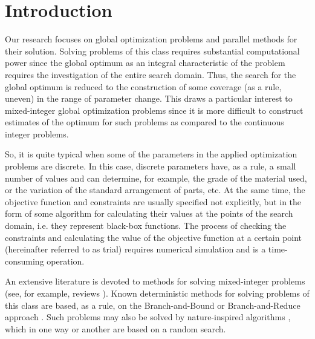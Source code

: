 \documentclass[
11pt,%
tightenlines,%
twoside,%
onecolumn,%
nofloats,%
nobibnotes,%
nofootinbib,%
superscriptaddress,%
noshowpacs,%
centertags]%
{revtex4}
\begin{document}

\maketitle


\section{Introduction}

Our research focuses on global optimization problems and parallel methods for their solution. Solving problems of this class requires substantial computational power since the global optimum as an integral characteristic of the problem requires the investigation of the entire search domain. Thus, the search for the global optimum is reduced to the construction of some coverage (as a rule, uneven) in the range of parameter change. This draws a particular interest to mixed-integer global optimization problems since it is more difficult to construct estimates of the optimum for such problems as compared to the continuous integer problems. 

So, it is quite typical when some of the parameters in the applied optimization problems are discrete. In this case, discrete parameters have, as a rule, a small number of values and can determine, for example, the grade of the material used, or the variation of the standard arrangement of parts, etc.
At the same time, the objective function and constraints are usually specified not explicitly, but in the form of some algorithm for calculating their values at the points of the search domain, i.e. they represent black-box functions. The process of checking the constraints and calculating the value of the objective function at a certain point (hereinafter referred to as trial) requires numerical simulation and is a time-consuming operation. 

An extensive literature is devoted to methods for solving mixed-integer problems (see, for example, reviews \cite{Burer,Boukouvala}). Known deterministic methods for solving problems of this class are based, as a rule, on the Branch-and-Bound \cite{Belotti} or Branch-and-Reduce approach \cite{Vigerske}. Such problems may also be solved by nature-inspired algorithms \cite{Deep,Schluter}, which in one way or another are based on a random search.
\end{document}
